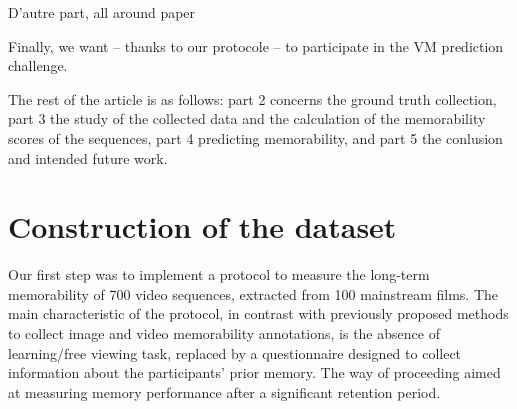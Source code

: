 \documentclass[sigconf]{acmart}
\begin{document}
D'autre part, all around paper

Finally, we want -- thanks to our protocole -- to participate in the VM prediction challenge.

The rest of the article is as follows: part 2 concerns the ground truth collection, part 3 the study of the collected data and the calculation of the memorability scores of the sequences, part 4 predicting memorability, and part 5 the conlusion and intended future work.






\section{Construction of the dataset}
Our first step was to implement a protocol to measure the long-term memorability of 700 video sequences, extracted from 100 mainstream films.
The main characteristic of the protocol, in contrast with previously proposed methods to collect image and video memorability annotations, is the absence of learning/free viewing task, replaced by a questionnaire designed to collect information about the participants' prior memory.
The way of proceeding aimed at measuring memory performance after a significant retention period.
\end{document}
